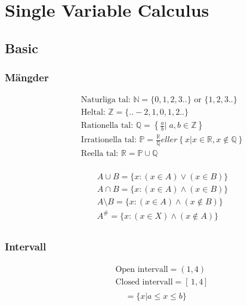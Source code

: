 \chapter{Single Variable Calculus}

\newpage

\begin{multicols}{2}
\section{Basic}
\subsection{Mängder}
\begin{align*}
  &\quad \text{Naturliga tal: } \mathbb{N} = \{0, 1, 2 , 3 ..  \} \text{ or } \{1, 2 , 3 ..  \} \\
  &\quad \text{Heltal: }\mathbb{Z} = \{.. -2, 1, 0, 1, 2 ..  \} \\
  &\quad \text{Rationella tal: }\mathbb{Q} = \left\{ \frac{a}{b} \Big| \; a,b \in \mathbb{Z} \right\} \\
  &\quad \text{Irrationella tal: }\mathbb{P} = \frac{\mathbb{R}}{\mathbb{Q}}eller \left\{ x | x \in \mathbb{R}, x \notin \mathbb{Q} \right\} \\
  &\quad \text{Reella tal: }\mathbb{R} =  \mathbb{P} \cup \mathbb{Q} \\
\end{align*}

\begin{align*}
  &\quad A \cup B = \{ x:(x \in A) \lor (x \in B)\} \\
  &\quad A \cap B = \{ x:(x \in A) \land (x \in B)\} \\
  &\quad A \setminus B = \{ x:(x \in A) \land (x \notin B)\} \\
  &\quad A^{\text{\#}} = \{ x:(x \in X) \land (x \notin A)\} \\
\end{align*}


\subsection{Intervall}
\begin{align*}
  &\quad \text{Open intervall} = (1,4) \\
  &\quad \text{Closed intervall} = [ \, 1,4 ] \, \\
\end{align*}
\begin{equation}
[ \, a, b ] \, = \{ x | a \leq x \leq b \}
\end{equation}


\end{multicols}
